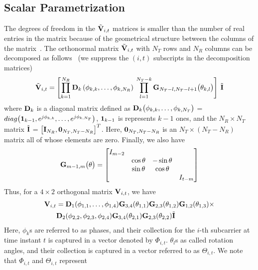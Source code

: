 \documentclass[journal,10pt,twocolumn]{IEEEtran}
\def\bD{{\bf D}}
\def\bG{{\bf G}}
\def\bI{{\bf I}}
\def\bV{{\bf V}}
\begin{document}
\subsection{Scalar Parametrization}
\label{givens}
The degrees of freedom in the $\tilde{\bV}_{i,t}$ matrices is smaller
than the number of real entries in the matrix because of the
geometrical structure between the columns of the
matrix~\cite{4114278}. The orthonormal matrix $\tilde{\bV}_{i,t}$ with
$N_T$ rows and $N_R$ columns can be decomposed as follows~\cite{4114278} (we suppress
the $(i, t)$ subscripts in the decomposition matrices)
\begin{equation}
\tilde{\bV}_{i,t} = \left[\prod_{k=1}^{N_{R}} \bD_{k} \left( \phi_{k,k},\ldots , \phi_{k,N_{R}} \right) \:  \prod_{l=1}^{N_{T}-k} \bG_{N_{T}-l,N_{T} -l+1} \big( \theta_{k,l}\big)  \right] \: \tilde{\bI}
\end{equation}
where $\bD_{k}$ is a diagonal matrix defined as
$\bD_{k}\big(\phi_{k,k}, \ldots, \phi_{k,N_T } \big)$ =
$\mbox{diag}\big( {\bf 1}_{k-1}, e^{j\phi_{k,k}},\ldots,
e^{j\phi_{k,N_T }} \big)$, ${\bf 1}_{k-1}$ is represents $k-1$ ones,
and the $N_R \times N_T$ matrix $\tilde{\bI}$ =
$\big[\bI_{N_R }, {\bf 0}_{N_T ,N_T -N_R}\big]^{T}$. Here,
${\bf 0}_{N_T ,N_T -N_R }$ is an $N_T\times (N_T - N_R)$ matrix all of
whose elements are zero. Finally, we also have
\begin{equation}
\bG_{m-1,m}\big(\theta\big)  =
\begin{bmatrix}
I_{m-2} & & & \\
& \cos\theta & -\sin\theta & \\
& \sin\theta & \cos\theta & \\
& & & I_{t-m}
\end{bmatrix}
\end{equation}
Thus, for a $4 \times 2$ orthogonal matrix $\bV_{i,t}$, we have
\begin{align*}
  \bV_{i,t} & =
  \bD_{1}(\phi_{1,1},\ldots,\phi_{1,4})\bG_{3,4}(\theta_{1,1})
  \bG_{2,3}(\theta_{1,2}) \bG_{1,2}(\theta_{1,3})\times\\
& \bD_{2}(\phi_{2,2},\phi_{2,3},\phi_{2,4}) \bG_{3,4}(\theta_{2,1}) \bG_{2,3}(\theta_{2,2})\tilde{\bI}
\end{align*}
Here, $\phi_{k}$s are referred to as phases, and their collection for
the $i$-th subcarrier at time instant $t$ is captured in a vector
denoted by $\Phi_{i,t}$. $\theta_{l}$s as called rotation angles, and
their collection is captured in a vector referred to as
$\Theta_{i,t}$. We note that $\Phi_{i,t}$ and $\Theta_{i,t}$ represent
\end{document}
